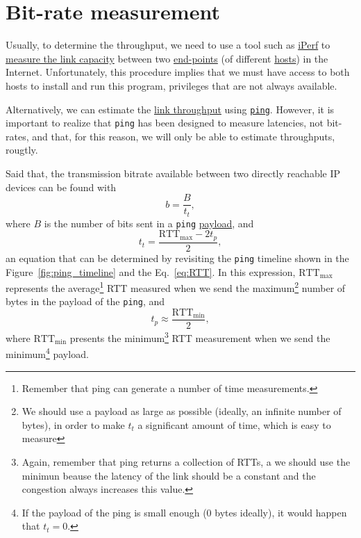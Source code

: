 \section{Bit-rate measurement}

Usually, to determine the throughput, we need to use a tool such as
\href{https://iperf.fr/}{iPerf} to
\href{https://en.wikipedia.org/wiki/Measuring_network_throughput}{measure
  the link capacity} between two
\href{https://datatracker.ietf.org/doc/html/rfc4113}{end-points} (of
different \href{https://en.wikipedia.org/wiki/Host_(network)}{hosts})
in the Internet. Unfortunately, this procedure implies that we must
have access to both hosts to install and run this program, privileges
that are not always available.

Alternatively, we can estimate the
\href{https://en.wikipedia.org/wiki/Throughput}{link throughput} using
\href{https://github.com/torvalds/linux/blob/master/net/ipv4/ping.c}{\texttt{ping}}. However,
it is important to realize that \texttt{ping} has been designed to
measure latencies, not bit-rates, and that, for this reason, we will
only be able to estimate throughputs, rougtly.

Said that, the transmission bitrate available between two directly
reachable IP devices can be found with
\begin{equation}
  b=\frac{B}{t_t},
  \label{eq:b}
\end{equation}
where $B$ is the number of bits sent in a \verb|ping|
\href{https://en.wikipedia.org/wiki/Payload_(computing)}{payload}, and
\begin{equation}
  t_t = \frac{\text{RTT}_{\text{max}}-2t_p}{2},
  \label{eq:tt}
\end{equation}
an equation that can be determined by revisiting the \verb|ping|
timeline shown in the Figure~\ref{fig:ping_timeline}
and the Eq.~\ref{eq:RTT}. In this expression, $\text{RTT}_{\text{max}}$ represents
  the average\footnote{Remember that ping can generate a number of
    time measurements.} RTT measured when we send the
  maximum\footnote{We should use a payload as large as possible
    (ideally, an infinite number of bytes), in order to make $t_t$ a
    significant amount of time, which is easy to measure} number of
  bytes in the payload of the \verb|ping|, and
\begin{equation}
  t_p \approx \frac{\text{RTT}_{\text{min}}}{2},
  \label{eq:tp}
\end{equation}
where $\text{RTT}_{\text{min}}$ presents the minimum\footnote{Again,
  remember that ping returns a collection of RTTs, a we should use the
  minimun beause the latency of the link should be a constant and the
  congestion always increases this value.} RTT measurement when we
send the minimum\footnote{If the payload of the ping is small enough
  ($0$ bytes ideally), it would happen that $t_t=0$.} payload.

